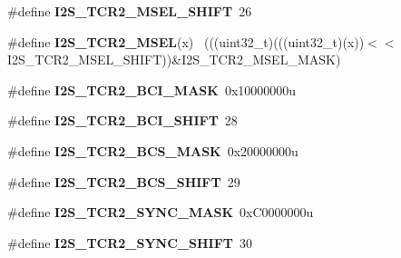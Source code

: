 \begin{DoxyCompactItemize}
\item 
\hypertarget{group___i2_s___register___masks_ga3f2208b190e1f9a951d300e726f6df76}{}\#define {\bfseries I2\+S\+\_\+\+T\+C\+R2\+\_\+\+M\+S\+E\+L\+\_\+\+S\+H\+I\+F\+T}~26\label{group___i2_s___register___masks_ga3f2208b190e1f9a951d300e726f6df76}

\item 
\hypertarget{group___i2_s___register___masks_gac012ee5d2d891d34e59c65d965be67a7}{}\#define {\bfseries I2\+S\+\_\+\+T\+C\+R2\+\_\+\+M\+S\+E\+L}(x)                                              ~(((uint32\+\_\+t)(((uint32\+\_\+t)(x))$<$$<$I2\+S\+\_\+\+T\+C\+R2\+\_\+\+M\+S\+E\+L\+\_\+\+S\+H\+I\+F\+T))\&I2\+S\+\_\+\+T\+C\+R2\+\_\+\+M\+S\+E\+L\+\_\+\+M\+A\+S\+K)\label{group___i2_s___register___masks_gac012ee5d2d891d34e59c65d965be67a7}

\item 
\hypertarget{group___i2_s___register___masks_ga1e16e8f58e2213ea6ea8fbe96f6b0b09}{}\#define {\bfseries I2\+S\+\_\+\+T\+C\+R2\+\_\+\+B\+C\+I\+\_\+\+M\+A\+S\+K}~0x10000000u\label{group___i2_s___register___masks_ga1e16e8f58e2213ea6ea8fbe96f6b0b09}

\item 
\hypertarget{group___i2_s___register___masks_gaa9612abbad00a02a4d3dc1a7dfe6463d}{}\#define {\bfseries I2\+S\+\_\+\+T\+C\+R2\+\_\+\+B\+C\+I\+\_\+\+S\+H\+I\+F\+T}~28\label{group___i2_s___register___masks_gaa9612abbad00a02a4d3dc1a7dfe6463d}

\item 
\hypertarget{group___i2_s___register___masks_ga8969a374d290181e8f2c7a1c5ff4f31b}{}\#define {\bfseries I2\+S\+\_\+\+T\+C\+R2\+\_\+\+B\+C\+S\+\_\+\+M\+A\+S\+K}~0x20000000u\label{group___i2_s___register___masks_ga8969a374d290181e8f2c7a1c5ff4f31b}

\item 
\hypertarget{group___i2_s___register___masks_ga4f9b5cf67219ec5115ced3b69bfda155}{}\#define {\bfseries I2\+S\+\_\+\+T\+C\+R2\+\_\+\+B\+C\+S\+\_\+\+S\+H\+I\+F\+T}~29\label{group___i2_s___register___masks_ga4f9b5cf67219ec5115ced3b69bfda155}

\item 
\hypertarget{group___i2_s___register___masks_ga2626d37b42ede711d867e8f750fb2c2c}{}\#define {\bfseries I2\+S\+\_\+\+T\+C\+R2\+\_\+\+S\+Y\+N\+C\+\_\+\+M\+A\+S\+K}~0x\+C0000000u\label{group___i2_s___register___masks_ga2626d37b42ede711d867e8f750fb2c2c}

\item 
\hypertarget{group___i2_s___register___masks_ga7817b4e017fd01d7ca9a59e87008656f}{}\#define {\bfseries I2\+S\+\_\+\+T\+C\+R2\+\_\+\+S\+Y\+N\+C\+\_\+\+S\+H\+I\+F\+T}~30\label{group___i2_s___register___masks_ga7817b4e017fd01d7ca9a59e87008656f}


\end{DoxyCompactItemize}
